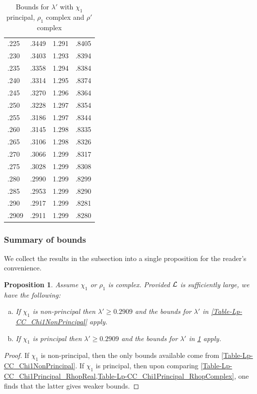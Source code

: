 \documentclass[12pt,psamsfonts]{amsart}
\newtheorem{prop}[thm]{Proposition}
\theoremstyle{definition}
\theoremstyle{remark}
\numberwithin{equation}{section}
\begin{document}
\begin{table}
\begin{tabular}{l|c|c|c}
 .225 &  .3449 &  1.291 &  .8405 \\ 
 .230 &  .3403 &  1.293 &  .8394 \\ 
 .235 &  .3358 &  1.294 &  .8384 \\ 
 .240 &  .3314 &  1.295 &  .8374 \\ 
 .245 &  .3270 &  1.296 &  .8364 \\ 
 .250 &  .3228 &  1.297 &  .8354 \\ 
 .255 &  .3186 &  1.297 &  .8344 \\ 
 .260 &  .3145 &  1.298 &  .8335 \\ 
 .265 &  .3106 &  1.298 &  .8326 \\ 
 .270 &  .3066 &  1.299 &  .8317 \\ 
 .275 &  .3028 &  1.299 &  .8308 \\ 
 .280 &  .2990 &  1.299 &  .8299 \\ 
 .285 &  .2953 &  1.299 &  .8290 \\ 
 .290 &  .2917 &  1.299 &  .8281 \\ 
 .2909 &  .2911 &  1.299 &  .8280 \\ 
\end{tabular}
\caption{Bounds for $\lambda'$ with $\chi_1$ principal, $\rho_1$ complex and $\rho'$ complex}
\label{Table-Lp-CC_Chi1Principal_RhopComplex}
\end{table}

\subsubsection{Summary of bounds} We collect the results in the subsection into a single proposition for the reader's convenience. 

\begin{prop} \label{Bounds-Lp-CC}
Assume $\chi_1$ or $\rho_1$ is complex. Provided $\mathcal{L}$ is sufficiently large, we have the following:
\begin{enumerate}[(a)]
	\item If $\chi_1$ is non-principal then $\lambda' \geq 0.2909$ and the bounds for $\lambda'$ in \cref{Table-Lp-CC_Chi1NonPrincipal} apply.
	\item If $\chi_1$ is principal then  $\lambda' \geq 0.2909$ and the bounds for $\lambda'$ in \cref{Table-Lp-CC_Chi1Principal_RhopComplex} apply.
\end{enumerate}
\end{prop}
\begin{proof} If $\chi_1$ is non-principal, then the only bounds available come from \cref{Table-Lp-CC_Chi1NonPrincipal}. If $\chi_1$ is principal, then upon comparing \cref{Table-Lp-CC_Chi1Principal_RhopReal,Table-Lp-CC_Chi1Principal_RhopComplex}, one finds that the latter gives weaker bounds.
\end{proof}
\end{document}
